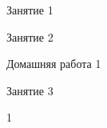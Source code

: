 
\begin{class}[number=1]
	\begin{listofex}
		\item Занятие 1
	\end{listofex}
\end{class}

\begin{class}[number=2]
	\begin{listofex}
		\item Занятие 2
	\end{listofex}
\end{class}

\begin{homework}[number=1]
	\begin{listofex}
		\item Домашняя работа 1
	\end{listofex}
\end{homework}

\begin{class}[number=3]
	\begin{listofex}
		\item Занятие 3 
	\end{listofex}
\end{class}

\begin{class}[number=4]
	\begin{listofex}
		\item 1
	\end{listofex}
\end{class}

